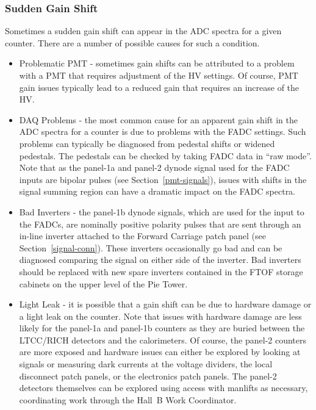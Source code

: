 \documentclass[12pt]{article}
\begin{document}
\subsubsection{Sudden Gain Shift}
\label{gain-shift}

Sometimes a sudden gain shift can appear in the ADC spectra for a given counter. There are a number 
of possible causes for such a condition.

\begin{itemize}
\item Problematic PMT - sometimes gain shifts can be attributed to a problem with a PMT that 
requires adjustment of the HV settings. Of course, PMT gain issues typically lead to a reduced 
gain that requires an increase of the HV. 
\item DAQ Problems - the most common cause for an apparent gain shift in the ADC spectra for a 
counter is due to problems with the FADC settings. Such problems can typically be diagnosed from 
pedestal shifts or widened pedestals. The pedestals can be checked by taking FADC data in ``raw 
mode''. Note that as the panel-1a and panel-2 dynode signal used for the FADC inputs are bipolar 
pulses (see Section~\ref{pmt-signals}), issues with shifts in the signal summing region can have 
a dramatic impact on the FADC spectra. 
\item Bad Inverters - the panel-1b dynode signals, which are used for the input to the FADCs, 
are nominally positive polarity pulses that are sent through an in-line inverter attached to the 
Forward Carriage patch panel (see Section~\ref{signal-conn}). These inverters occasionally go bad 
and can be diagnosed comparing the signal on either side of the inverter. Bad inverters should be 
replaced with new spare inverters contained in the FTOF storage cabinets on the upper level of the 
Pie Tower.
\item Light Leak - it is possible that a gain shift can be due to hardware damage or a light leak 
on the counter. Note that issues with hardware damage are less likely for the panel-1a and panel-1b 
counters as they are buried between the LTCC/RICH detectors and the calorimeters. Of course, the 
panel-2 counters are more exposed and hardware issues can either be explored by looking at signals 
or measuring dark currents at the voltage dividers, the local disconnect patch panels, or the 
electronics patch panels. The panel-2 detectors themselves can be explored using access with 
manlifts as necessary, coordinating work through the Hall~B Work Coordinator.
\end{itemize}
\end{document}
